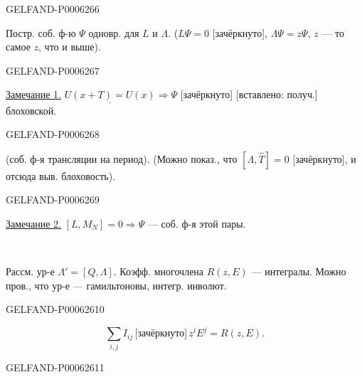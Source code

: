 \begin{GelfandAdjacentEvidence}{GELFAND-P000626}{6}

Постр. соб. ф-ю \(\Psi\) одновр. для \(L\) и \(\Lambda\).
(\(L\Psi=0\) [зачёркнуто], \(\Lambda\Psi=z\Psi\),
\(z\) --- то самое \(z\), что и выше).
\end{GelfandAdjacentEvidence}
\begin{GelfandAdjacentEvidence}{GELFAND-P000626}{7}


\underline{Замечание 1.} \(\underline{U(x+T)=U(x)}\Longrightarrow\Psi\)
[зачёркнуто] [вставлено: получ.] блоховской.
\end{GelfandAdjacentEvidence}
\begin{GelfandAdjacentEvidence}{GELFAND-P000626}{8}

(соб. ф-я трансляции на период). (Можно показ., что \([\Lambda,\widehat T]=0\) [зачёркнуто],
и отсюда выв. блоховость).
\end{GelfandAdjacentEvidence}
\begin{GelfandAdjacentEvidence}{GELFAND-P000626}{9}


\underline{Замечание 2.} \([L,M_N]=0\Longrightarrow\Psi\)
--- соб. ф-я этой пары.
\begin{center}\textemdash\,\textperiodcentered\,\textemdash\end{center}

Рассм. ур-е \(\Lambda'=[Q,\Lambda]\).
Коэфф. многочлена \(R(z,E)\) --- интегралы.
Можно пров., что ур-е --- гамильтоновы, интегр. инволют.
\end{GelfandAdjacentEvidence}
\begin{GelfandAdjacentEvidence}{GELFAND-P000626}{10}

\[
\sum_{i,j} I_{ij}\,\text{[зачёркнуто]}\, z^iE^j=R(z,E).
\]
\end{GelfandAdjacentEvidence}
\begin{GelfandAdjacentEvidence}{GELFAND-P000626}{11}

\end{GelfandAdjacentEvidence}
